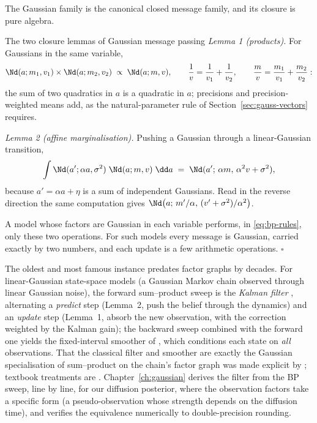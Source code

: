 The Gaussian family is the canonical closed message family, and its
closure is pure algebra.

\begin{toolbox}[tb:closure]{The two closure lemmas of Gaussian message passing}
\emph{Lemma 1 (products).} For Gaussians in the same variable,
\begin{equation*}
  \Nd(a; m_1, v_1) \times \Nd(a; m_2, v_2)
  \;\propto\; \Nd(a; m, v),
  \qquad
  \frac{1}{v} = \frac{1}{v_1} + \frac{1}{v_2},
  \qquad
  \frac{m}{v} = \frac{m_1}{v_1} + \frac{m_2}{v_2} :
\end{equation*}
the sum of two quadratics in $a$ is a quadratic in $a$; precisions and
precision-weighted means add, as the natural-parameter rule of
Section~\ref{sec:gauss-vectors} requires.

\emph{Lemma 2 (affine marginalisation).} Pushing a Gaussian through a
linear-Gaussian transition,
\begin{equation*}
  \int \Nd(a'; \alpha a, \sigma^2)\; \Nd(a; m, v)\; \dd a
  \;=\; \Nd(a';\, \alpha m,\, \alpha^2 v + \sigma^2),
\end{equation*}
because $a' = \alpha a + \eta$ is a sum of independent Gaussians. Read in
the reverse direction the same computation gives
$\Nd\big(a;\, m'/\alpha,\, (v' + \sigma^2)/\alpha^2\big)$.

A model whose factors are Gaussian in each variable performs, in
\eqref{eq:bp-rules}, only these two operations. For such models every
message is Gaussian, carried exactly by two numbers, and each update is
a few arithmetic operations. \hfill$\square$
\end{toolbox}

The oldest and most famous instance predates factor graphs by decades.
For linear-Gaussian state-space models (a Gaussian Markov chain observed
through linear Gaussian noise), the forward sum--product sweep is the
\emph{Kalman filter} \citep{kalman1960new}, alternating a
\emph{predict} step (Lemma~2, push the belief through the dynamics) and
an \emph{update} step (Lemma~1, absorb the new observation, with the
correction weighted by the Kalman gain); the backward sweep combined with
the forward one yields the fixed-interval smoother of
\citet{rauch1965maximum}, which conditions each state on \emph{all}
observations. That the classical filter and smoother are exactly the
Gaussian specialisation of sum--product on the chain's factor graph was
made explicit by \citet{kschischang2001factor}; textbook treatments are
\citet{bishop2006pattern, koller2009probabilistic}.
Chapter~\ref{ch:gaussian} derives the filter from the BP sweep, line by
line, for our diffusion posterior, where the observation factors take a
specific form (a pseudo-observation whose strength depends on the
diffusion time), and verifies the equivalence numerically to
double-precision rounding.

